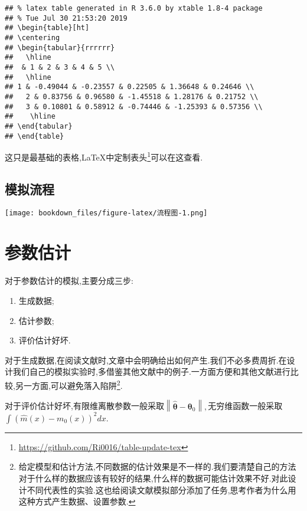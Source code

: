 \documentclass[]{ctexbook}
\providecommand{\tightlist}{%
  \setlength{\itemsep}{0pt}\setlength{\parskip}{0pt}}
\renewcommand{\href}[2]{#2\footnote{\url{#1}}}
\begin{document}
\begin{verbatim}
## % latex table generated in R 3.6.0 by xtable 1.8-4 package
## % Tue Jul 30 21:53:20 2019
## \begin{table}[ht]
## \centering
## \begin{tabular}{rrrrrr}
##   \hline
##  & 1 & 2 & 3 & 4 & 5 \\ 
##   \hline
## 1 & -0.49044 & -0.23557 & 0.22505 & 1.36648 & 0.24646 \\ 
##   2 & 0.83756 & 0.96580 & -1.45518 & 1.28176 & 0.21752 \\ 
##   3 & 0.10801 & 0.58912 & -0.74446 & -1.25393 & 0.57356 \\ 
##    \hline
## \end{tabular}
## \end{table}
\end{verbatim}

这只是最基础的表格,LaTeX中\href{https://github.com/Ri0016/table-update-tex}{定制表头}可以在这查看.

\hypertarget{section-8}{%
\section{模拟流程}\label{section-8}}

\texttt{[image: bookdown\_files/figure-latex/流程图-1.png]}

\hypertarget{section-9}{%
\chapter{参数估计}\label{section-9}}

对于参数估计的模拟,主要分成三步:

\begin{enumerate}
\def\labelenumi{\arabic{enumi}.}
\tightlist
\item
  生成数据;
\item
  估计参数;
\item
  评价估计好坏.
\end{enumerate}

对于生成数据,在阅读文献时,文章中会明确给出如何产生.我们不必多费周折.在设计我们自己的模拟实验时,多借鉴其他文献中的例子.一方面方便和其他文献进行比较,另一方面,可以避免落入陷阱\footnote{给定模型和估计方法,不同数据的估计效果是不一样的.我们要清楚自己的方法对于什么样的数据应该有较好的结果,什么样的数据可能估计效果不好.对此设计不同代表性的实验.这也给阅读文献模拟部分添加了任务,思考作者为什么用这种方式产生数据、设置参数.}.

对于评价估计好坏,有限维离散参数一般采取\(\left\|\hat{\boldsymbol{\theta}}-\boldsymbol{\theta}_{0}\right\|,\)无穷维函数一般采取\(\int\left(\hat{m}(x)-m_{0}(x)\right)^{2} d x.\)
\end{document}
